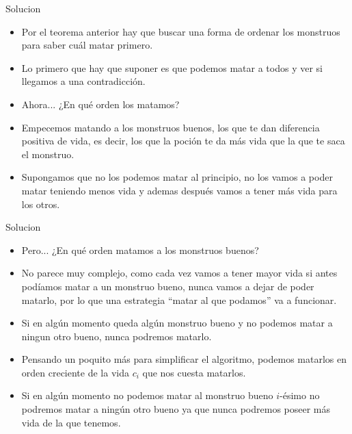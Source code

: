 \documentclass{beamer}
\begin{document}
\begin{frame}{Solucion}
  \begin{itemize}
    \item Por el teorema anterior hay que buscar una forma de ordenar los
      monstruos para saber cuál matar primero.\pause
    \item Lo primero que hay que suponer es que podemos matar a todos
      y ver si llegamos a una contradicción.\pause
    \item Ahora... ¿En qué orden los matamos?\pause
    \item Empecemos matando a los monstruos buenos, los que te dan
      diferencia positiva de vida, es decir, los que la poción te da más
      vida que la que te saca el monstruo.\pause
    \item Supongamos que no los podemos matar al principio, no los
      vamos a poder matar teniendo menos vida y ademas después vamos 
      a tener más vida para los otros.
  \end{itemize}
\end{frame}

\begin{frame}{Solucion}
  \begin{itemize}
    \item Pero... ¿En qué orden matamos a los monstruos buenos?
    \item No parece muy complejo, como cada vez vamos a tener mayor
      vida si antes podíamos matar a un monstruo bueno, nunca
      vamos a dejar de poder matarlo, por lo que una estrategia “matar
      al que podamos” va a funcionar.\pause
    \item Si en algún momento queda algún monstruo bueno y no podemos
      matar a ningun otro bueno, nunca podremos matarlo.\pause
    \item Pensando un poquito más para simplificar el algoritmo, podemos
      matarlos en orden creciente de la vida $c_i$ que nos cuesta matarlos.\pause
    \item Si en algún momento no podemos matar al monstruo bueno
      $i$-ésimo no podremos matar a ningún otro bueno ya que nunca
      podremos poseer más vida de la que tenemos.
  \end{itemize}
\end{frame}
\end{document}
